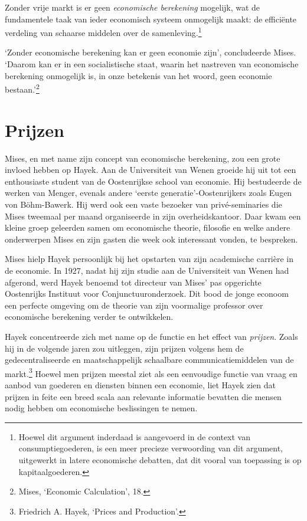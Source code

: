 \documentclass[
  a5paper,
  smalldemyvopaper,11pt,twoside,onecolumn,openright,extrafontsizes]{memoir}
\begin{document}
Zonder vrije markt is er geen \emph{economische berekening} mogelijk,
wat de fundamentele taak van ieder economisch systeem onmogelijk maakt:
de efficiënte verdeling van schaarse middelen over de
samenleving.\footnote{Hoewel dit argument inderdaad is aangevoerd in de
  context van consumptiegoederen, is een meer precieze verwoording van
  dit argument, uitgewerkt in latere economische debatten, dat dit
  vooral van toepassing is op kapitaalgoederen.}

`Zonder economische berekening kan er geen economie zijn', concludeerde
Mises. `Daarom kan er in een socialistische staat, waarin het nastreven
van economische berekening onmogelijk is, in onze betekenis van het
woord, geen economie bestaan.'\footnote{\hspace{0pt}Mises, `Economic
  Calculation', 18.}

\section{Prijzen}\label{prijzen}

Mises, en met name zijn concept van economische berekening, zou een
grote invloed hebben op Hayek. Aan de Universiteit van Wenen groeide hij
uit tot een enthousiaste student van de Oostenrijkse school van
economie. Hij bestudeerde de werken van Menger, evenals andere `eerste
generatie'-Oostenrijkers zoals Eugen von Böhm-Bawerk. Hij werd ook een
vaste bezoeker van privé-seminaries die Mises tweemaal per maand
organiseerde in zijn overheidskantoor. Daar kwam een kleine groep
geleerden samen om economische theorie, filosofie en welke andere
onderwerpen Mises en zijn gasten die week ook interessant vonden, te
bespreken.

Mises hielp Hayek persoonlijk bij het opstarten van zijn academische
carrière in de economie. In 1927, nadat hij zijn studie aan de
Universiteit van Wenen had afgerond, werd Hayek benoemd tot directeur
van Mises' pas opgerichte Oostenrijks Instituut voor
Conjunctuuronderzoek. Dit bood de jonge econoom een perfecte omgeving om
de theorie van zijn voormalige professor over economische berekening
verder te ontwikkelen.

Hayek concentreerde zich met name op de functie en het effect van
\emph{prijzen}. Zoals hij in de volgende jaren zou uitleggen, zijn
prijzen volgens hem de gedecentraliseerde en maatschappelijk schaalbare
communicatiemiddelen van de markt.\footnote{Friedrich A. Hayek, `Prices
  and Production'.} Hoewel men prijzen meestal ziet als een eenvoudige
functie van vraag en aanbod van goederen en diensten binnen een
economie, liet Hayek zien dat prijzen in feite een breed scala aan
relevante informatie bevatten die mensen nodig hebben om economische
beslissingen te nemen.
\end{document}
